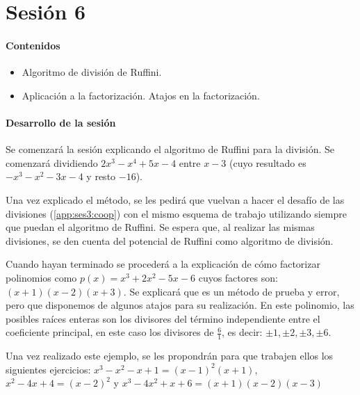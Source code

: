 
\section{Sesión 6}

\paragraph{Contenidos}
\begin{itemize}
	\item Algoritmo de división de Ruffini.
	\item Aplicación a la factorización.
	\subitem Atajos en la factorización.
\end{itemize}

\paragraph{Desarrollo de la sesión}

Se comenzará la sesión explicando el algoritmo de Ruffini para la división. 
%
Se comenzará dividiendo $2x^3-x^4+5x-4$ entre $x-3$ (cuyo resultado es $-x^3-x^2-3x-4$ y resto $-16$).

Una vez explicado el método, se les pedirá que vuelvan a hacer el desafío de las divisiones (\ref{app:ses3:coop}) con el mismo esquema de trabajo utilizando siempre que puedan el algoritmo de Ruffini.
%
Se espera que, al realizar las mismas divisiones, se den cuenta del potencial de Ruffini como algoritmo de división.

Cuando hayan terminado se procederá a la explicación de cómo factorizar polinomios como $ p(x) = x^3+2x^2-5x-6$ cuyos factores son: $(x+1)(x-2)(x+3)$. 
%
Se explicará que es un método de prueba y error,  pero que disponemos de algunos atajos para su realización. 
%
En este polinomio, las posibles raíces enteras son los divisores del término independiente entre el coeficiente principal, en este caso los divisores de $\frac{6}{1}$, es decir: $\pm1,\pm2,\pm3,\pm6$.

Una vez realizado este ejemplo, se les propondrán para que trabajen ellos los siguientes ejercicios: $x^3-x^2-x+1 = (x-1)^2(x+1)$, $x^2-4x+4 = (x-2)^2$ y $x^3-4x^2+x+6 = (x+1)(x-2)(x-3)$

